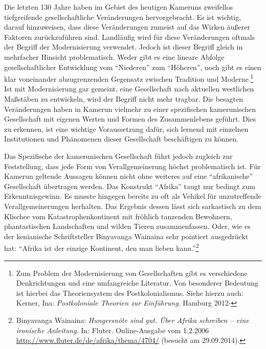 \documentclass[a4paper,
fontsize=11pt,
oneside,
numbers=noperiodatend,
parskip=half-,
bibliography=totoc,
final
]{scrartcl}
\begin{document}
Die letzten 130 Jahre haben im Gebiet des heutigen Kameruns zweifellos
tiefgreifende gesellschaftliche Veränderungen hervorgebracht. Es ist
wichtig, darauf hinzuweisen, dass diese Veränderungen zumeist auf das
Wirken äußerer Faktoren zurückzuführen sind. Landläufig wird für diese
Veränderungen oftmals der Begriff der Modernisierung verwendet. Jedoch
ist dieser Begriff gleich in mehrfacher Hinsicht problematisch. Weder
gibt es eine lineare Abfolge gesellschaftlicher Entwicklung vom
\enquote{Niederen} zum \enquote{Höheren}, noch gibt es einen klar
voneinander abzugrenzenden Gegensatz zwischen Tradition und
Moderne.\footnote{Zum Problem der Modernisierung von Gesellschaften gibt
  es verschiedene Denkrichtungen und eine umfangreiche Literatur. Von
  besonderer Bedeutung ist hierbei das Theoriensystem des
  Postkolonialismus. Siehe hierzu auch: Kerner, Ina: \emph{Postkoloniale
  Theorien zur Einführung}. Hamburg 2012-} Ist mit Modernisierung gar
gemeint, eine Gesellschaft nach aktuellen westlichen Maßstäben zu
entwickeln, wird der Begriff nicht mehr tragbar. Die besagten
Veränderungen haben in Kamerun vielmehr zu einer spezifischen
kamerunischen Gesellschaft mit eigenen Werten und Formen des
Zusammenlebens geführt. Dies zu erkennen, ist eine wichtige
Voraussetzung dafür, sich lernend mit einzelnen Institutionen und
Phänomenen dieser Gesellschaft beschäftigen zu können.

Das Spezifische der kamerunischen Gesellschaft führt jedoch zugleich zur
Feststellung, dass jede Form von Verallgemeinerung höchst problematisch
ist. Für Kamerun geltende Aussagen können nicht ohne weiteres auf eine
\enquote{afrikanische} Gesellschaft übertragen werden. Das Konstrukt
\enquote{Afrika} taugt nur bedingt zum Erkenntnisgewinn. Es musste
hingegen bereits zu oft als Vehikel für unzutreffende
Verallgemeinerungen herhalten. Das Ergebnis dessen lässt sich
sarkastisch zu dem Klischee vom Katastrophenkontinent mit fröhlich
tanzenden Bewohnern, phantastischen Landschaften und wilden Tieren
zusammenfassen. Oder, wie es der kenianische Schriftsteller Binyavanga
Wainaina sehr pointiert ausgedrückt hat: \enquote{Afrika ist der einzige
Kontinent, den man lieben kann.}\footnote{Binyavanga Wainaina:
  \emph{Hungersnöte sind gut. Über Afrika schreiben -- eine ironische
  Anleitung}. In: Fluter. Online-Ausgabe vom 1.2.2006
  \url{http://www.fluter.de/de/afrika/thema/4704/} (besucht am
  29.09.2014).}
\end{document}
